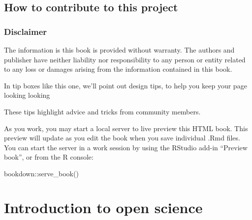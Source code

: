\documentclass[
]{book}
\newenvironment{Shaded}{\begin{snugshade}}{\end{snugshade}}
\newcommand{\FunctionTok}[1]{\textcolor[rgb]{0.00,0.00,0.00}{#1}}
\newcommand{\NormalTok}[1]{#1}
\newcommand{\SpecialCharTok}[1]{\textcolor[rgb]{0.00,0.00,0.00}{#1}}
\begin{document}
\hypertarget{how-to-contribute-to-this-project}{%
\section*{How to contribute to this project}\label{how-to-contribute-to-this-project}}

\hypertarget{disclaimer}{%
\subsection*{Disclaimer}\label{disclaimer}}

The information is this book is provided without warranty. The authors and publisher have neither liability nor responsibility to any person or entity related to any loss or damages arising from the information contained in this book.

In tip boxes like this one, we'll point out design tips, to help you keep your page looking looking

These tips highlight advice and tricks from community members.

As you work, you may start a local server to live preview this HTML book. This preview will update as you edit the book when you save individual .Rmd files. You can start the server in a work session by using the RStudio add-in ``Preview book'', or from the R console:

\begin{Shaded}
\begin{Highlighting}[]
\NormalTok{bookdown}\SpecialCharTok{::}\FunctionTok{serve\_book}\NormalTok{()}
\end{Highlighting}
\end{Shaded}

\hypertarget{introduction-to-open-science}{%
\chapter{Introduction to open science}\label{introduction-to-open-science}}
\end{document}
